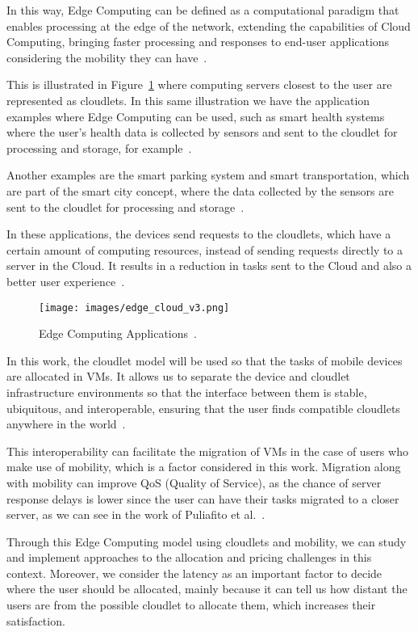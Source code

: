 \documentclass[English]{ic-tese-v3}
\begin{document}
In this way, Edge Computing can be defined as a computational paradigm that enables processing at the edge of the network, extending the capabilities of Cloud Computing, bringing faster processing and responses to end-user applications considering the mobility they can have~\cite{DustdarEdge2016, HassanRole2020, KhanEdge2019}. 

This is illustrated in Figure~\ref{fig:arch_edge} where computing servers closest to the user are represented as cloudlets. In this same illustration we have the application examples where Edge Computing can be used, such as smart health systems where the user's health data is collected by sensors and sent to the cloudlet for processing and storage, for example~\cite{KhanEdge2019, HassanRole2020}. 

Another examples are the smart parking system and smart transportation, which are part of the smart city concept, where the data collected by the sensors are sent to the cloudlet for processing and storage~\cite{KhanEdge2019}.

In these applications, the devices send requests to the cloudlets, which have a certain amount of computing resources, instead of sending requests directly to a server in the Cloud. It results in a reduction in tasks sent to the Cloud and also a better user experience~\cite{JieGTO2019}.
\begin{figure}
    \centering
    \texttt{[image: images/edge\_cloud\_v3.png]}
    \caption[Edge Computing Applications]{Edge Computing Applications~\cite{KhanEdge2019}.}
    \label{fig:arch_edge}
\end{figure}

In this work, the cloudlet model will be used so that the tasks of mobile devices are allocated in VMs. It allows us to separate the device and cloudlet infrastructure environments so that the interface between them is stable, ubiquitous, and interoperable, ensuring that the user finds compatible cloudlets anywhere in the world~\cite{SatyanaCloudlet2009}.

This interoperability can facilitate the migration of VMs in the case of users who make use of mobility, which is a factor considered in this work. Migration along with mobility can improve QoS (Quality of Service), as the chance of server response delays is lower since the user can have their tasks migrated to a closer server, as we can see in the work of Puliafito et al.~\cite{MobFogSim2020}.

Through this Edge Computing model using cloudlets and mobility, we can study and implement approaches to the allocation and pricing challenges in this context. Moreover, we consider the latency as an important factor to decide where the user should be allocated, mainly because it can tell us how distant the users are from the possible cloudlet to allocate them, which increases their satisfaction.
\end{document}
